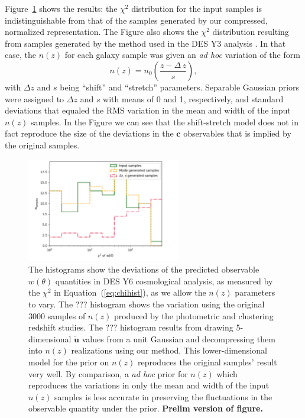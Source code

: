 \documentclass[linenumbers, onecolumn]{aastex63}
\newcommand{\eqq}[1]{Equation~(\ref{#1})}
\newcommand{\vecc}{\ensuremath{\mathbf{c}}}
\newcommand{\vecu}{\ensuremath{\mathbf{u}}}
\begin{document}
Figure~\ref{fig:chihist} shows the results: the $\chi^2$ distribution
for the input samples is indistinguishable from that of the samples
generated by our compressed, normalized representation.
The Figure also shows the $\chi^2$ distribution resulting from samples
generated by the method used in the DES Y3 analysis \citep{y3pz}.  In
that case, the $n(z)$ for each galaxy sample was given an \textit{ad
  hoc} variation of the form
\begin{equation}
  n(z) = n_0\left(\frac{z-\Delta\,z}{s}\right),
\end{equation}
with $\Delta z$ and $s$ being ``shift'' and ``stretch'' parameters.
Separable Gaussian priors were assigned to $\Delta z$ and $s$ with
means of 0 and 1, respectively, and standard deviations that equaled
the RMS variation in the mean and width of the input $n(z)$ samples.
In the Figure we can see that the shift-stretch model does not in fact
reproduce the size of the deviations in the $\vecc$ observables that
is implied by the original samples.

\begin{figure}
  \center
  \includegraphics[width=0.6\textwidth]{chihist.pdf}
\caption{The histograms show the deviations of the predicted observable $w(\theta)$ quantities in
  DES Y6 cosmological analysis, as measured by the $\chi^2$ in
  \eqq{eq:chihist}, as we allow the $n(z)$ parameters to vary.  The
  ??? histogram shows the variation using the original 3000 samples of
  $n(z)$ produced by the photometric and clustering redshift studies.
  The ??? histogram results from
  drawing 5-dimensional $\widetilde{\vecu}$ values from a unit
  Gaussian and decompressing them into $n(z)$ realizations using our
  method.  This lower-dimensional model for the prior on $n(z)$
  reproduces the original samples' result very well.  By comparison,
  a \textit{ad hoc} prior for $n(z)$ which reproduces the variations in only the mean
  and width of the input $n(z)$ samples is less accurate in preserving
  the fluctuations in the observable quantity under the
  prior. \textbf{Prelim version of figure.} }
\label{fig:chihist}
\end{figure}
\end{document}
